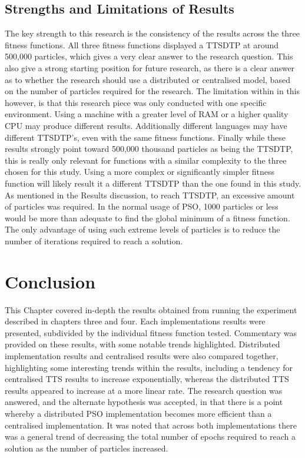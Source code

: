 \documentclass[oneside,12pt]{book}
\begin{document}
\subsection{Strengths and Limitations of Results}
The key strength to this research is the consistency of the results across the three fitness functions. All three fitness functions displayed a TTSDTP at around 500,000 particles, which gives a very clear answer to the research question. This also give a strong starting position for future research, as there is a clear answer as to whether the research should use a distributed or centralised model, based on the number of particles required for the research. The limitation within in this however, is that this research piece was only conducted with one specific environment. Using a machine with a greater level of RAM or a higher quality CPU may produce different results. Additionally different languages may have different TTSDTP's, even with the same fitness functions. Finally while these results strongly point toward 500,000 thousand particles as being the TTSDTP, this is really only relevant for functions with a similar complexity to the three chosen for this study. Using a more complex or significantly simpler fitness function will likely result it a different TTSDTP than the one found in this study. As mentioned in the Results discussion, to reach TTSDTP, an excessive amount of particles was required. In the normal usage of PSO, 1000 particles or less would be more than adequate to find the global minimum of a fitness function. The only advantage of using such extreme levels of particles is to reduce the number of iterations required to reach a solution.

\section{Conclusion}
This Chapter covered in-depth the results obtained from running the experiment described in chapters three and four. Each implementations results were presented, subdivided by the individual fitness function tested. Commentary was provided on these results, with some notable trends highlighted. 
Distributed implementation results and centralised results were also compared together, highlighting some interesting trends within the results, including a tendency for centralised TTS results to increase exponentially, whereas the distributed TTS results appeared to increase at a more linear rate. The research question was answered, and the alternate hypothesis was accepted, in that there is a point whereby a distributed PSO implementation becomes more efficient than a centralised implementation. It was noted that across both implementations there was a general trend of decreasing the total number of epochs required to reach a solution as the number of particles increased.
\end{document}
